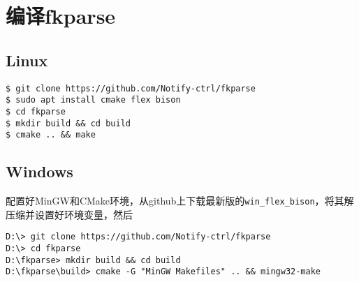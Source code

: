 \chapter{编译fkparse}

\section{Linux}

\begin{verbatim}
$ git clone https://github.com/Notify-ctrl/fkparse
$ sudo apt install cmake flex bison
$ cd fkparse
$ mkdir build && cd build
$ cmake .. && make
\end{verbatim}

\section{Windows}

配置好MinGW和CMake环境，从github上下载最新版的\verb|win_flex_bison|，将其解压缩并设置好环境变量，然后

\begin{verbatim}
D:\> git clone https://github.com/Notify-ctrl/fkparse
D:\> cd fkparse
D:\fkparse> mkdir build && cd build
D:\fkparse\build> cmake -G "MinGW Makefiles" .. && mingw32-make
\end{verbatim}
